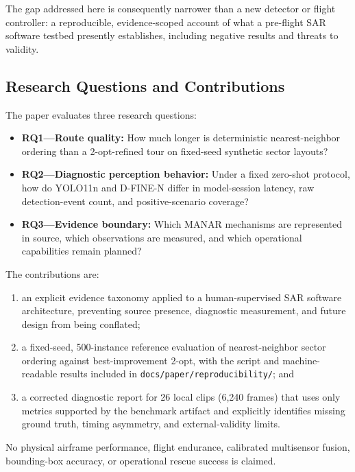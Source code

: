 The gap addressed here is consequently narrower than a new detector or flight controller: a reproducible, evidence-scoped account of what a pre-flight SAR software testbed presently establishes, including negative results and threats to validity.

\subsection{Research Questions and Contributions}

The paper evaluates three research questions:
\begin{itemize}
    \item \textbf{RQ1---Route quality:} How much longer is deterministic nearest-neighbor ordering than a 2-opt-refined tour on fixed-seed synthetic sector layouts?
    \item \textbf{RQ2---Diagnostic perception behavior:} Under a fixed zero-shot protocol, how do YOLO11n and D-FINE-N differ in model-session latency, raw detection-event count, and positive-scenario coverage?
    \item \textbf{RQ3---Evidence boundary:} Which MANAR mechanisms are represented in source, which observations are measured, and which operational capabilities remain planned?
\end{itemize}

The contributions are:
\begin{enumerate}
    \item an explicit evidence taxonomy applied to a human-supervised SAR software architecture, preventing source presence, diagnostic measurement, and future design from being conflated;
    \item a fixed-seed, 500-instance reference evaluation of nearest-neighbor sector ordering against best-improvement 2-opt, with the script and machine-readable results included in \texttt{docs/paper/reproducibility/}; and
    \item a corrected diagnostic report for 26 local clips (6,240 frames) that uses only metrics supported by the benchmark artifact and explicitly identifies missing ground truth, timing asymmetry, and external-validity limits.
\end{enumerate}

No physical airframe performance, flight endurance, calibrated multisensor fusion, bounding-box accuracy, or operational rescue success is claimed.
